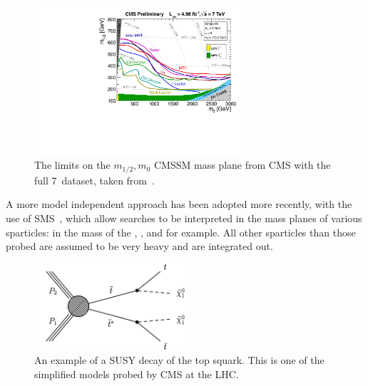  \begin{figure}[htbp]
   \begin{center}
   \includegraphics[width=0.7\textwidth]{Figures/theory/CMS_SUSY_2011Limits5fb_tanb10.pdf}
   \caption{The limits on the $m_{1/2}, m_{0}$ \ac{CMSSM} mass plane from \ac{CMS} with the full 7~\TeV dataset, taken from~\cite{tw:CMSSMlimits7TeV}.}
   \label{fig:cmssmlimits}
   \end{center}
 \end{figure}

A more model independent approach has been adopted more recently, with the use of \ac{SMS}~\cite{SMS1,SMS2,SMS3, SMSPaper}, which allow searches to be interpreted in the mass planes of various sparticles: in the mass of the \sTop, \sbottom, \squark and \chiOneZero for example.
All other sparticles than those probed are assumed to be very heavy and are integrated out.

\begin{figure}[htbp]
  \begin{center}
  \includegraphics[width=0.5\textwidth]{Figures/theory/T2tt.png}
  \caption{An example of a \ac{SUSY} decay of the top squark. This is one of the simplified models probed by \ac{CMS} at the \ac{LHC}.}
  \label{fig:t2tt}
  \end{center}
\end{figure}


